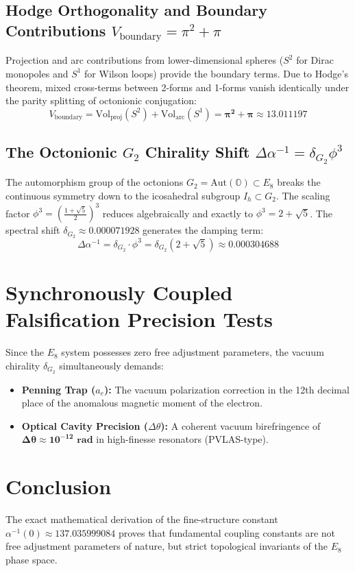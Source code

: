 \documentclass[11pt,a4paper]{article}
\begin{document}
\subsection{Hodge Orthogonality and Boundary Contributions $V_{\text{boundary}} = \pi^2 + \pi$}
Projection and arc contributions from lower-dimensional spheres ($S^2$ for Dirac monopoles and $S^1$ for Wilson loops) provide the boundary terms. Due to Hodge's theorem, mixed cross-terms between 2-forms and 1-forms vanish identically under the parity splitting of octonionic conjugation:
\begin{equation}
V_{\text{boundary}} = \text{Vol}_{\text{proj}}(S^2) + \text{Vol}_{\text{arc}}(S^1) = \mathbf{\pi^2 + \pi \approx 13.011197}
\end{equation}

\subsection{The Octonionic $G_2$ Chirality Shift $\Delta\alpha^{-1} = \delta_{G_2}\phi^3$}
The automorphism group of the octonions $G_2 = \text{Aut}(\mathbb{O}) \subset E_8$ breaks the continuous symmetry down to the icosahedral subgroup $I_h \subset G_2$. The scaling factor $\phi^3 = \left(\frac{1+\sqrt{5}}{2}\right)^3$ reduces algebraically and exactly to $\phi^3 = 2 + \sqrt{5}$. The spectral shift $\delta_{G_2} \approx 0.000071928$ generates the damping term:
\begin{equation}
\Delta\alpha^{-1} = \delta_{G_2} \cdot \phi^3 = \delta_{G_2}(2 + \sqrt{5}) \approx \mathbf{0.000304688}
\end{equation}

\section{Synchronously Coupled Falsification Precision Tests}
Since the $E_8$ system possesses zero free adjustment parameters, the vacuum chirality $\delta_{G_2}$ simultaneously demands:
\begin{itemize}
    \item \textbf{Penning Trap ($a_e$):} The vacuum polarization correction in the 12th decimal place of the anomalous magnetic moment of the electron.
    \item \textbf{Optical Cavity Precision ($\Delta\theta$):} A coherent vacuum birefringence of $\mathbf{\Delta\theta \approx 10^{-12} \text{ rad}}$ in high-finesse resonators (PVLAS-type).
\end{itemize}

\section{Conclusion}
The exact mathematical derivation of the fine-structure constant $\alpha^{-1}(0) \approx 137.035999084$ proves that fundamental coupling constants are not free adjustment parameters of nature, but strict topological invariants of the $E_8$ phase space.
\end{document}
